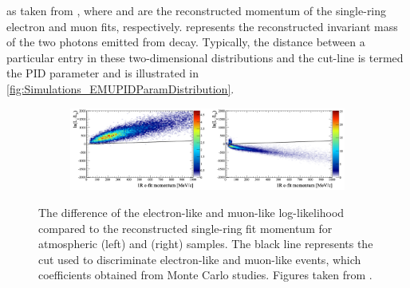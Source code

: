 as taken from \cite{t2k_tn_319}, where  and  are the reconstructed momentum of the single-ring electron and muon fits, respectively.  represents the reconstructed invariant mass of the two photons emitted from  decay. Typically, the distance between a particular entry in these two-dimensional distributions and the cut-line is termed the PID parameter and is illustrated in \autoref{fig:Simulations_EMUPIDParamDistribution}.

\begin{figure}[h]
  \begin{subfigure}[t]{0.9\textwidth}
    \includegraphics[width=\textwidth, trim={0mm 0mm 0mm 0mm}, clip, page=1]{Figures/Simulations/LogLikelihoodDiscriminator.pdf}
  \end{subfigure}
  \caption{The difference of the electron-like and muon-like log-likelihood compared to the reconstructed single-ring fit momentum for atmospheric  (left) and \quickmath{\nu_{\mu}} (right) samples. The black line represents the cut used to discriminate electron-like and muon-like events, which coefficients obtained from Monte Carlo studies. Figures taken from \cite{t2k_tn_146}.}
  \label{fig:Simulations_LLHDiscriminator}
\end{figure}


